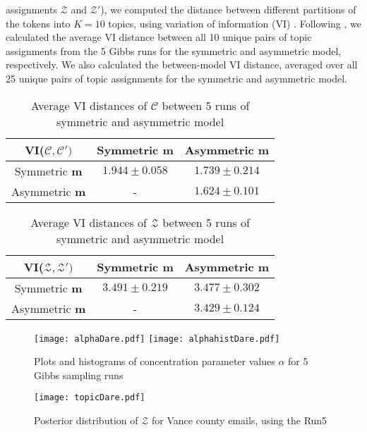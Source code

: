 \documentclass[a4paper]{article}
\begin{document}
assignments $\mathcal{Z}$ and $\mathcal{Z'}$), we computed the distance between different partitions
of the tokens into $K=10$ topics, using variation
of information (VI) \citep{meilua2003comparing}. Following \cite{wallach2009rethinking}, we calculated
the average VI distance between all 10 unique pairs of topic assignments from the 5 Gibbs runs for the symmetric and asymmetric model, respectively. We also calculated the between-model
VI distance, averaged over all 25 unique pairs of topic assignments for the symmetric and asymmetric model. 
\footnotesize
\begin{table}[ht]
	\centering
	\begin{tabular}{|c|c|c|} 
		\hline
		\textbf{VI($\mathcal{C}, \mathcal{C'})$}& Symmetric \textbf{$\boldsymbol{m}$} &Asymmetric \textbf{ $\boldsymbol{m}$} \\
		\hline
		Symmetric \textbf{$\boldsymbol{m}$} &  $1.944\pm 0.058$&  $1.739\pm 0.214$\\
		\hline
		Asymmetric \textbf{$\boldsymbol{m}$} & - & $1.624 \pm 0.101$\\
		\hline
	\end{tabular}
	\caption {Average VI distances of $\mathcal{C}$ between 5 runs of symmetric and asymmetric model }
	\label{table:VIforC}
\end{table}
\begin{table}[ht]
	\centering
	\begin{tabular}{|c|c|c|} 
		\hline
		\textbf{VI($\mathcal{Z}, \mathcal{Z'})$}& Symmetric \textbf{$\boldsymbol{m}$} &Asymmetric \textbf{ $\boldsymbol{m}$} \\
		\hline
		Symmetric \textbf{$\boldsymbol{m}$} &  $3.491\pm 0.219$&  $3.477\pm 0.302$\\
		\hline
		Asymmetric \textbf{$\boldsymbol{m}$} & - & $3.429\pm 0.124$\\
		\hline
	\end{tabular}
	\caption {Average VI distances of $\mathcal{Z}$ between 5 runs of symmetric and asymmetric model}
	\label{table:VIforZ}
\end{table}
\normalsize
\begin{figure}[ht]
	\centering
	\texttt{[image: alphaDare.pdf]} 
	\texttt{[image: alphahistDare.pdf]} 
	\caption{Plots and histograms of concentration parameter values $\alpha$ for 5 Gibbs sampling runs}
	\label{fig:alpha}
\end{figure}
\footnotesize
\begin{figure}[ht]
	\centering
	\texttt{[image: topicDare.pdf]} 
	\caption{Posterior distribution of  $\mathcal{Z}$ for Vance county emails, using the Run5}
	\label{fig:topicsymasym}
\end{figure}
\end{document}
